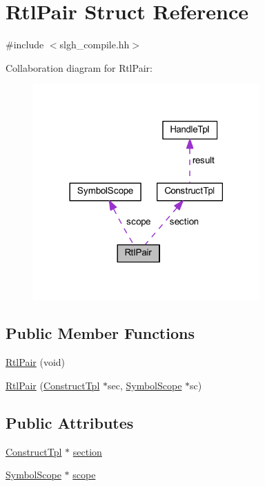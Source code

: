 \hypertarget{struct_rtl_pair}{}\section{Rtl\+Pair Struct Reference}
\label{struct_rtl_pair}


{\ttfamily \#include $<$slgh\+\_\+compile.\+hh$>$}



Collaboration diagram for Rtl\+Pair\+:
\nopagebreak
\begin{figure}[H]
\begin{center}
\leavevmode
\includegraphics[width=246pt]{struct_rtl_pair__coll__graph}
\end{center}
\end{figure}
\subsection*{Public Member Functions}
\begin{DoxyCompactItemize}
\item 
\mbox{\hyperlink{struct_rtl_pair_a4aae3ffbbdc84e9843c001533b685c81}{Rtl\+Pair}} (void)
\item 
\mbox{\hyperlink{struct_rtl_pair_ae0e978d12f04656959f99f57a8921ade}{Rtl\+Pair}} (\mbox{\hyperlink{class_construct_tpl}{Construct\+Tpl}} $\ast$sec, \mbox{\hyperlink{class_symbol_scope}{Symbol\+Scope}} $\ast$sc)
\end{DoxyCompactItemize}
\subsection*{Public Attributes}
\begin{DoxyCompactItemize}
\item 
\mbox{\hyperlink{class_construct_tpl}{Construct\+Tpl}} $\ast$ \mbox{\hyperlink{struct_rtl_pair_a83b3e82db716d0b9e452e89be19f9e76}{section}}
\item 
\mbox{\hyperlink{class_symbol_scope}{Symbol\+Scope}} $\ast$ \mbox{\hyperlink{struct_rtl_pair_af8f9a3537ba20e94c08491d3fed84969}{scope}}
\end{DoxyCompactItemize}


